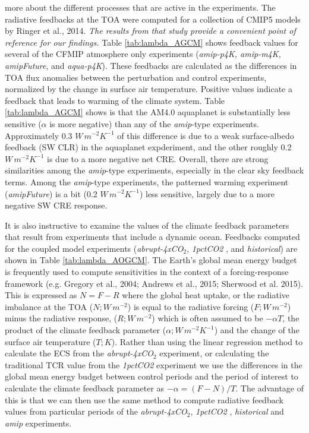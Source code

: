 \documentclass[draft]{agujournal2019}
\begin{document}
more about the different processes that are active in the experiments.    
The radiative feedbacks at the TOA were computed for a collection of CMIP5 models by Ringer et al., 2014.  
\textit{The results from that study provide a convenient point of reference for our findings.}  
Table \ref{tab:lambda_AGCM} shows feedback values for several of the CFMIP atmosphere only experiments 
(\textit{amip-p4K, amip-m4K, amipFuture}, and \textit{aqua-p4K}).  These feedbacks are calculated as the 
differences in TOA flux anomalies between the perturbation and control experiments, normalized 
by the change in surface air temperature.   Positive values indicate a feedback that leads to warming of the climate system. 
Table \ref{tab:lambda_AGCM}  shows is that the AM4.0 aquaplanet is substantially less sensitive 
($\alpha$ is more negative) than any of the \textit{amip}-type experiments.  Approximately 0.3 $W\, m^{-2} K^{-1}$ 
of this difference is due to a weak surface-albedo feedback (SW CLR) in the aquaplanet expderiment, and the other roughly 
0.2 $W\, m^{-2} K^{-1}$ is due to a more negative net CRE.  Overall, there are strong similarities among the 
\textit{amip}-type experiments, especially in the clear sky feedback terms.  Among the \textit{amip}-type experiments, the 
patterned warming experiment (\textit{amipFuture}) is a bit (0.2 $W\, m^{-2} K^{-1}$) less sensitive, largely due to a more 
negative SW CRE response.  


It is also instructive to examine the values of the climate feedback parameters that result from experiments that include a 
dynamic ocean.  Feedbacks computed for the coupled model experiments (\textit{abrupt-4xCO$_2$}, \textit{1pctCO2} , and 
\textit{historical}) are shown in Table \ref{tab:lambda_AOGCM}.  The Earth's global mean energy budget is frequently used 
to compute sensitivities in the context of a forcing-response framework (e.g. Gregory et al., 2004; Andrews et al., 2015; 
Sherwood et al. 2015).  This is expressed as $N=F-R$ where the global heat uptake, or the radiative imbalance at the TOA 
($N; W\, m^{-2}$) is equal to the radiative forcing ($F;  W\, m^{-2}$) minus the radiative response, ($R; W\, m^{-2}$) which is 
often assumed to be $-\alpha T$, the product of the climate feedback parameter ($\alpha;  W\, m^{-2} K^{-1}$) and the change 
of the surface air temperature ($T; K$).  
Rather than using the linear regression method to calculate the ECS from the \textit{abrupt-4xCO$_2$} experiment, or calculating the 
traditional TCR value from the \textit{1pctCO2} experiment we use the differences in the global mean energy budget between control 
periods and the period of interest to calculate the climate feedback parameter as $-\alpha = (F-N)/T$. 
The advantage of this is that we can then use the same method to compute radiative feedback values from particular periods of the 
\textit{abrupt-4xCO$_2$}, \textit{1pctCO2} , \textit{historical} and \textit{amip} experiments.     
\end{document}
